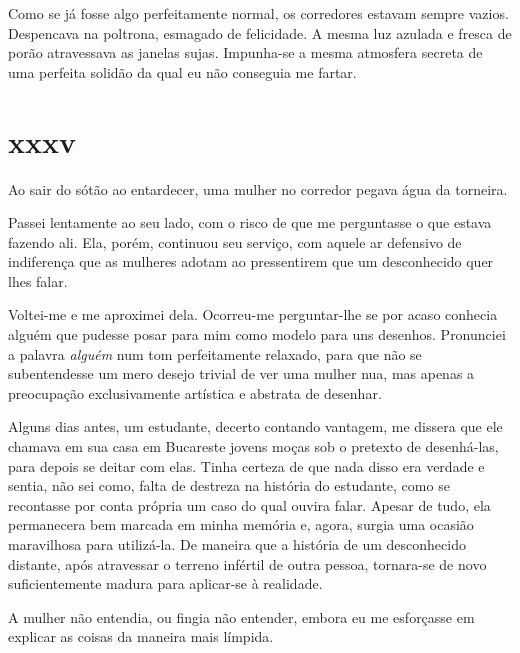 Como se já fosse algo perfeitamente normal, os corredores estavam sempre
vazios. Despencava na poltrona, esmagado de felicidade. A mesma luz azulada e
fresca de porão atravessava as janelas sujas. Impunha-se a mesma atmosfera
secreta de uma perfeita solidão da qual eu não conseguia me fartar.


\section{xxxv} 


Ao sair do sótão ao entardecer, uma mulher no corredor pegava água da
torneira.

Passei lentamente ao seu lado, com o risco de que me perguntasse o que estava
fazendo ali. Ela, porém, continuou seu serviço, com aquele ar defensivo de
indiferença que as mulheres adotam ao pressentirem que um desconhecido quer
lhes falar.


Voltei-me e me aproximei dela. Ocorreu-me perguntar-lhe se por acaso conhecia
alguém que pudesse posar para mim como modelo para uns desenhos. Pronunciei a
palavra \textit{alguém} num tom perfeitamente relaxado, para que não se
subentendesse um mero desejo trivial de ver uma mulher nua, mas apenas a
preocupação exclusivamente artística e abstrata de desenhar.

Alguns dias antes, um estudante, decerto contando vantagem, me dissera que ele
chamava em sua casa em Bucareste jovens moças sob o pretexto de desenhá-las,
para depois se deitar com elas. Tinha certeza de que nada disso era verdade e
sentia, não sei como, falta de destreza na história do estudante, como se
recontasse por conta própria um caso do qual ouvira falar. Apesar de tudo,
ela permanecera bem marcada em minha memória e, agora, surgia uma ocasião
maravilhosa para utilizá-la. De maneira que a história de um desconhecido
distante, após atravessar o terreno infértil de outra pessoa, tornara-se de
novo suficientemente madura para aplicar-se à realidade.

A mulher não entendia, ou fingia não entender, embora eu me esforçasse em
explicar as coisas da maneira mais límpida.

